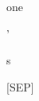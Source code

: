 \documentclass[varwidth=150mm]{standalone}
\begin{document}
\begin{CJK*}{UTF8}{gbsn}
{{{\colorbox{red!1.9358799457550049}{\strut one} \colorbox{red!1.5494019985198975}{\strut '} \colorbox{red!8.04814624786377}{\strut s} \colorbox{red!10.641170501708984}{\strut [SEP]}
}}}
\end{CJK*}
\end{document}
